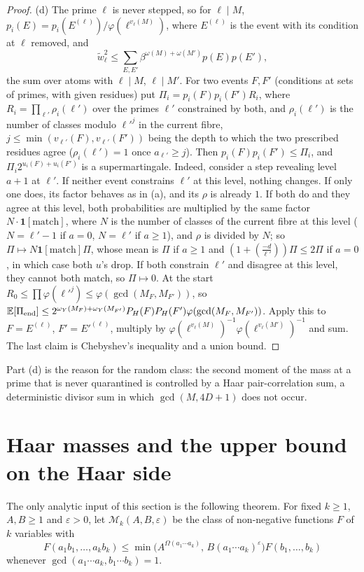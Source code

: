 \documentclass[11pt,reqno]{amsart}
\theoremstyle{definition}
\newcommand{\E}{\mathbb E}
\newcommand{\cM}{\mathcal M}
\begin{document}
\begin{proof}
(d) The prime $\ell$ is never stepped, so for $\ell\mid M$,
$p_i(E)=p_i(E^{(\ell)})/\varphi(\ell^{v_\ell(M)})$, where $E^{(\ell)}$ is the event
with its condition at $\ell$ removed, and
\[
 \tilde w_\ell^2\le\sum_{E,E'}\beta^{\omega(M)+\omega(M')}p(E)p(E'),
\]
the sum over
atoms with $\ell\mid M$, $\ell\mid M'$.  For two events $F,F'$ (conditions at sets
of primes, with given residues) put $\Pi_i=p_i(F)p_i(F')R_i$, where
$R_i=\prod_{\ell'}\rho_i(\ell')$ over the primes $\ell'$ constrained by both, and
$\rho_i(\ell')$ is the number of classes modulo $\ell'^{j}$ in the current
fibre, $j\le\min(v_{\ell'}(F),v_{\ell'}(F'))$ being the depth to which the two
prescribed residues agree ($\rho_i(\ell')=1$ once $a_{\ell'}\ge j$).  Then
$p_i(F)p_i(F')\le\Pi_i$, and $\Pi_i2^{u_i(F)+u_i(F')}$ is a supermartingale.
Indeed, consider a step revealing level $a+1$ at $\ell'$.  If neither event
constrains $\ell'$ at this level, nothing changes.  If only one does, its
factor behaves as in (a), and its $\rho$ is already $1$.  If both do and they
agree at this level, both probabilities are multiplied by the same factor
$N\cdot\mathbf 1[\text{match}]$, where $N$ is the number of classes of the
current fibre at this level ($N=\ell'-1$ if $a=0$, $N=\ell'$ if $a\ge1$), and
$\rho$ is divided by $N$; so $\Pi\mapsto N\mathbf 1[\text{match}]\Pi$, whose mean
is $\Pi$ if $a\ge1$ and $(1+(\frac{-d}{\ell'}))\Pi\le2\Pi$ if $a=0$, in which
case both $u$'s drop.  If both constrain $\ell'$ and disagree at this level,
they cannot both match, so $\Pi\mapsto0$.  At the start
$R_0\le\prod\varphi(\ell'^{j})\le\varphi(\gcd(M_F,M_{F'}))$, so
$\E[\Pi_{\rm end}]\le2^{\omega_Y(M_F)+\omega_Y(M_{F'})}P_H(F)P_H(F')\varphi(\gcd(M_F,M_{F'}))$.
Apply this to $F=E^{(\ell)}$, $F'=E'^{(\ell)}$, multiply by
$\varphi(\ell^{v_\ell(M)})^{-1}\varphi(\ell^{v_\ell(M')})^{-1}$ and sum.  The last claim
is Chebyshev's inequality and a union bound.
\end{proof}

Part (d) is the reason for the random class: the second moment of the mass
at a prime that is never quarantined is controlled by a Haar
pair-correlation sum, a deterministic divisor sum in which $\gcd(M,4D+1)$ does
not occur.

\section{Haar masses and the upper bound on the Haar side}\label{sec:moment}

The only analytic input of this section is the following theorem.  For
fixed $k\ge1$, $A,B\ge1$ and $\varepsilon>0$, let $\cM_k(A,B,\varepsilon)$ be the
class of non-negative functions $F$ of $k$ variables with
\[
 F(a_1b_1,\dots,a_kb_k)\le\min\big(A^{\Omega(a_1\cdots a_k)},\,B(a_1\cdots a_k)^\varepsilon\big)F(b_1,\dots,b_k)
\]
whenever $\gcd(a_1\cdots a_k,b_1\cdots b_k)=1$.
\end{document}
